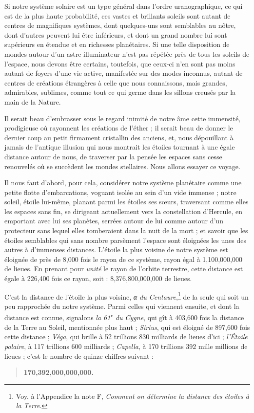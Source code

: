 \documentclass[a4paper, 11pt, oneside, landscape]{article}
\begin{document}
Si notre système solaire est un type général dans l'ordre uranographique, ce qui est de la plus haute probabilité, ces vastes et brillants soleils sont autant de centres de magnifiques systèmes, dont quelques-uns sont semblables au nôtre, dont d'autres peuvent lui être inférieurs, et dont un grand nombre lui sont supérieurs en étendue et en richesses planétaires. Si une telle disposition de mondes autour d'un astre illuminateur n'est pas répétée près de tous les soleils de l'espace, nous devons être certains, toutefois, que ceux-ci n'en sont pas moins autant de foyers d'une vie active, manifestée sur des modes inconnus, autant de centres de créations étrangères à celle que nous connaissons, mais grandes, admirables, sublimes, comme tout ce qui germe dans les sillons creusés par la main de la Nature.

Il serait beau d'embrasser sous le regard inimité de notre âme cette immensité, prodigieuse où rayonnent les créations de l'éther ; il serait beau de donner le dernier coup au petit firmament cristallin des anciens, et, nous dépouillant à jamais de l'antique illusion qui nous montrait les étoiles tournant à une égale distance autour de nous, de traverser par la pensée les espaces sans cesse renouvelés où se succèdent les mondes stellaires. Nous allons essayer ce voyage.

Il nous faut d'abord, pour cela, considérer notre système planétaire comme une petite flotte d'embarcations, voguant isolée au sein d'un vide immense ; notre soleil, étoile lui-même, planant parmi les étoiles ses sœurs, traversant comme elles les espaces sans fin, se dirigeant actuellement vers la constellation d'Hercule, en emportant avec lui ses planètes, serrées autour de lui comme autour d'un protecteur sans lequel elles tomberaient dans la nuit de la mort ; et savoir que les étoiles semblables qui sans nombre parsèment l'espace sont éloignées les unes des autres à d'immenses distances. L'étoile la plus voisine de notre système est éloignée de près de 8,000 fois le rayon de ce système, rayon égal à 1,100,000,000 de lieues. En prenant pour \emph{unité} le rayon de l'orbite terrestre, cette distance est égale à 226,400 fois ce rayon, soit : 8,376,800,000,000 de lieues.

C'est la distance de l'étoile la plus voisine, \emph{α du Centaure},\footnote{Voy. à l'Appendice la note F, \emph{Comment on détermine la distance des étoiles à la Terre}.} de la seule qui soit un peu rapprochée du notre système. Parmi celles qui viennent ensuite, et dont la distance est connue, signalons \emph{la 61\textsuperscript{e} du Cygne}, qui gît à 403,600 fois la distance de la Terre au Soleil, mentionnée plus haut ; \emph{Sirius}, qui est éloigné de 897,600 fois cette distance ; \emph{Véga}, qui brille à 52 trillions 830 milliards de lieues d'ici ; \emph{l'Étoile polaire}, à 117 trillions 600 milliards ; \emph{Capella}, à 170 trillions 392 mille millions de lieues ; c'est le nombre de quinze chiffres suivant :
\begin{quotation}\bfseries\small
170,392,000,000,000.
\end{quotation}
\end{document}
